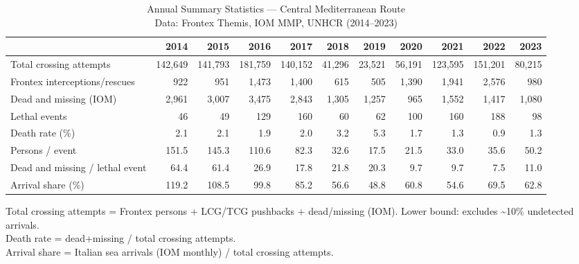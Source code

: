 \begin{table}[t]
\caption*{
{\fontsize{20}{25}\selectfont  Annual Summary Statistics — Central Mediterranean Route\fontsize{12}{15}\selectfont } \\ 
{\fontsize{14}{17}\selectfont  Data: Frontex Themis, IOM MMP, UNHCR (2014–2023)\fontsize{12}{15}\selectfont }
} 
\fontsize{12.0pt}{14.0pt}\selectfont
\begin{tabular*}{\linewidth}{@{\extracolsep{\fill}}l|rrrrrrrrrr}
\toprule
 & 2014 & 2015 & 2016 & 2017 & 2018 & 2019 & 2020 & 2021 & 2022 & 2023 \\ 
\midrule\addlinespace[2.5pt]
Total crossing attempts & 142,649 & 141,793 & 181,759 & 140,152 & 41,296 & 23,521 & 56,191 & 123,595 & 151,201 & 80,215 \\ 
Frontex interceptions/rescues & 922 & 951 & 1,473 & 1,400 & 615 & 505 & 1,390 & 1,941 & 2,576 & 980 \\ 
Dead and missing (IOM) & 2,961 & 3,007 & 3,475 & 2,843 & 1,305 & 1,257 & 965 & 1,552 & 1,417 & 1,080 \\ 
Lethal events & 46 & 49 & 129 & 160 & 60 & 62 & 100 & 160 & 188 & 98 \\ 
Death rate (\%) & 2.1 & 2.1 & 1.9 & 2.0 & 3.2 & 5.3 & 1.7 & 1.3 & 0.9 & 1.3 \\ 
Persons / event & 151.5 & 145.3 & 110.6 & 82.3 & 32.6 & 17.5 & 21.5 & 33.0 & 35.6 & 50.2 \\ 
Dead and missing / lethal event & 64.4 & 61.4 & 26.9 & 17.8 & 21.8 & 20.3 & 9.7 & 9.7 & 7.5 & 11.0 \\ 
Arrival share (\%) & 119.2 & 108.5 & 99.8 & 85.2 & 56.6 & 48.8 & 60.8 & 54.6 & 69.5 & 62.8 \\ 
\bottomrule
\end{tabular*}
\begin{minipage}{\linewidth}
\vspace{.05em}
Total crossing attempts = Frontex persons + LCG/TCG pushbacks + dead/missing (IOM). Lower bound: excludes \textasciitilde{}10\% undetected arrivals.\\
Death rate = dead+missing / total crossing attempts.\\
Arrival share = Italian sea arrivals (IOM monthly) / total crossing attempts.\\
\end{minipage}
\end{table}

